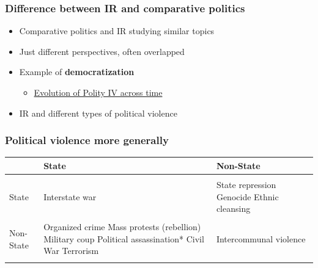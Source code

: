 \documentclass[aspectratio=43]{beamer}
\begin{document}
\begin{frame}
\frametitle{Difference between IR and comparative politics}
\centering

\begin{itemize}
  \item Comparative politics and IR studying similar topics
  \item Just different perspectives, often overlapped
  \item Example of \textbf{democratization}
  \begin{itemize}
    \item \href{https://dartthrowingchimp.files.wordpress.com/2012/09/politymovie3.gif}{Evolution of Polity IV across time}
  \end{itemize}
  \item IR and different types of political violence
\end{itemize}

\end{frame}

\begin{frame}
\frametitle{Political violence more generally}
\centering

\begin{tabular}{m{1.75cm}|m{4cm}m{4cm}}
& {\color{gray}{\footnotesize Target:}} \newline State & {\color{gray}{\footnotesize Target:}} \newline Non-State \\\hline\\
{\color{gray}{\footnotesize Perpetrator:}} \newline State & Interstate war & State repression \newline Genocide \newline Ethnic cleansing \\\\
{\color{gray}{\footnotesize Perpetrator:}} \newline Non-State & Organized crime \newline Mass protests (rebellion) \newline Military coup \newline Political assassination* \newline Civil War \newline Terrorism & Intercommunal violence\\\\\hline
\end{tabular}

\end{frame}
\end{document}
